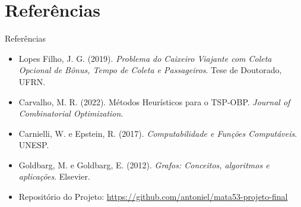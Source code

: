 \documentclass[aspectratio=169,xcolor=table]{beamer}
\begin{document}
\section{Referências}
\begin{frame}{Referências}
    \begin{itemize}
        \item Lopes Filho, J. G. (2019). \emph{Problema do Caixeiro Viajante com Coleta Opcional de Bônus, Tempo de Coleta e Passageiros}. Tese de Doutorado, UFRN.
        \item Carvalho, M. R. (2022). Métodos Heurísticos para o TSP-OBP. \emph{Journal of Combinatorial Optimization}.
        \item Carnielli, W. e Epstein, R. (2017). \emph{Computabilidade e Funções Computáveis}. UNESP.
        \item Goldbarg, M. e Goldbarg, E. (2012). \emph{Grafos: Conceitos, algoritmos e aplicações}. Elsevier.
        \item Repositório do Projeto: \url{https://github.com/antoniel/mata53-projeto-final}
    \end{itemize}
\end{frame}
\end{document}
